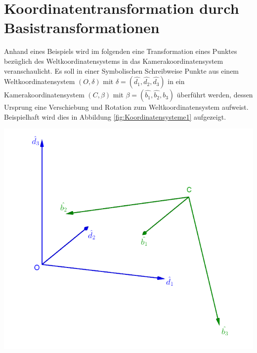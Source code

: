 %
%

\section{Koordinatentransformation durch Basistransformationen}

Anhand eines Beispiels wird im folgenden eine Transformation eines Punktes bezüglich des Weltkoordinatensystems in das Kamerakoordinatensystem veranschaulicht. Es soll in einer Symbolischen Schreibweise Punkte aus einem Weltkoordinatensystem  
$(O,\delta)$ mit $\delta = (\hat{d_1},\hat{d_2},\hat{d_3})$ in ein Kamerakoordinatensystem  $(C,\beta)$ mit $\beta = (\hat{b_1},\hat{b_2},\hat{b_3})$ überführt werden, dessen Ursprung eine Verschiebung und Rotation zum Weltkoordinatensystem aufweist. Beispielhaft wird dies in Abbildung \ref{fig:Koordinatensysteme1} aufgezeigt.
 
	\begin{minipage}{\linewidth}
		\centering
		\includegraphics[width=0.7\linewidth]{images/WeltKordSys.png}
		\label{fig:Koordinatensysteme1}
	\end{minipage}\\ \\
	
